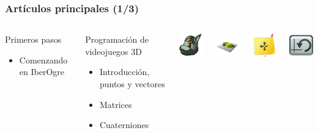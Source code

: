 \documentclass[green]{beamer}
\begin{document}
\begin{frame}
\transdissolve
    \frametitle{Artículos principales (1/3)}
        
    \begin{columns}[c]
    \column{200pt}
        
	\begin{block}{Primeros pasos}
            \begin{itemize}
                \item Comenzando en IberOgre
            \end{itemize}            
        \end{block}
	
	\begin{block}{Programación de videojuegos 3D}
            \begin{itemize}
                \item Introducción, puntos y vectores
		\item Matrices
		\item Cuaterniones
            \end{itemize}            
        \end{block}

    \column{100pt}
        
	\begin{center}
	    \includegraphics[scale=0.4]{img/iberogre-cabeza.png}
	\end{center}
	
	\begin{center}
	    \includegraphics[scale=0.4]{img/vectores.png}
	\end{center}
	
	\begin{center}
	    \includegraphics[scale=0.4]{img/matrices.png}
	\end{center}
	
	\begin{center}
	    \includegraphics[scale=0.4]{img/cuaterniones.png}
	\end{center}
    \end{columns} 
\end{frame}
\end{document}

